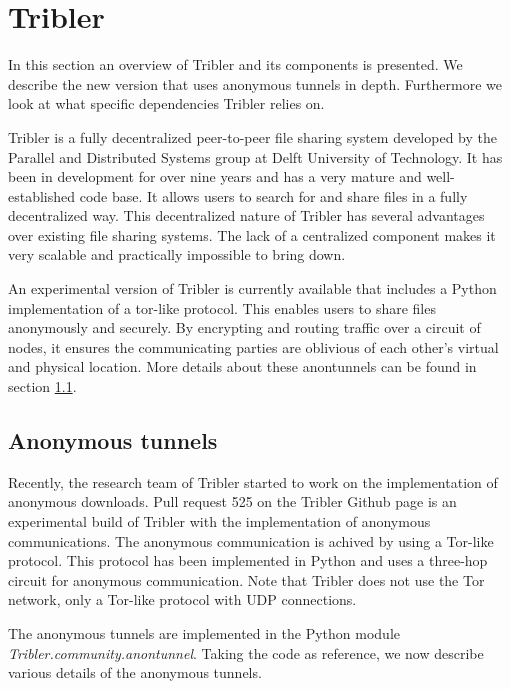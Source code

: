 

\section{Tribler}
	\label{scc:tribler}
	In this section an overview of Tribler and its components is presented. We describe the new version that uses anonymous tunnels in depth. Furthermore we look at what specific dependencies Tribler relies on.

	Tribler is a fully decentralized peer-to-peer file sharing system developed by the Parallel and Distributed Systems group at Delft University of Technology. It has been in development for over nine years and has a very mature and well-established code base. It allows users to search for and share files in a fully decentralized way. This decentralized nature of Tribler has several advantages over existing file sharing systems. The lack of a centralized component makes it very scalable and practically impossible to bring down.
		
	An experimental version of Tribler is currently available that includes a Python implementation of a tor-like protocol. This enables users to share files anonymously and securely. By encrypting and routing traffic over a circuit of nodes, it ensures the communicating parties are oblivious of each other's virtual and physical location. More details about these anontunnels can be found in section \ref{sec:anonymoustunnels}.
	
	\subsection{Anonymous tunnels}
		\label{sec:anonymoustunnels}
			Recently, the research team of Tribler started to work on the implementation of anonymous downloads. Pull request 525 on the Tribler Github page \cite{pullrequest525} is an experimental build of Tribler with the implementation of anonymous communications. The anonymous communication is achived by using a Tor-like protocol. This protocol has been implemented in Python and uses a three-hop circuit for anonymous communication. Note that Tribler does not use the Tor network, only a Tor-like protocol with UDP connections.
			
			The anonymous tunnels are implemented in the Python module \emph{Tribler.community.anontunnel}. Taking the code as reference, we now describe various details of the anonymous tunnels.
			
